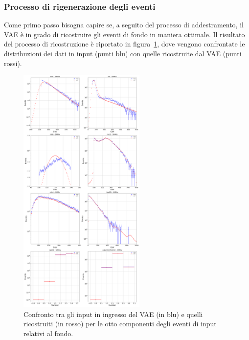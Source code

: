 \subsubsection{Processo di rigenerazione degli eventi}
\label{rigenerazione_eventi}
Come primo passo bisogna capire se, a seguito del processo di addestramento, il VAE è in grado di ricostruire gli eventi di fondo in maniera ottimale. Il risultato del processo di ricostruzione è riportato in figura~\ref{ricostruzione}, dove vengono confrontate le distribuzioni dei dati in input (punti blu) con quelle ricostruite dal VAE (punti rossi). 
\begin{figure}[h!]
	\centering
	\includegraphics[width=0.56\textwidth]{figs/risultati_simulazione/ricostruzione.png}
	\caption{Confronto tra gli input in ingresso del VAE (in blu) e quelli ricostruiti (in rosso) per le otto componenti degli eventi di input relativi al fondo.}
	\label{ricostruzione}
\end{figure}

